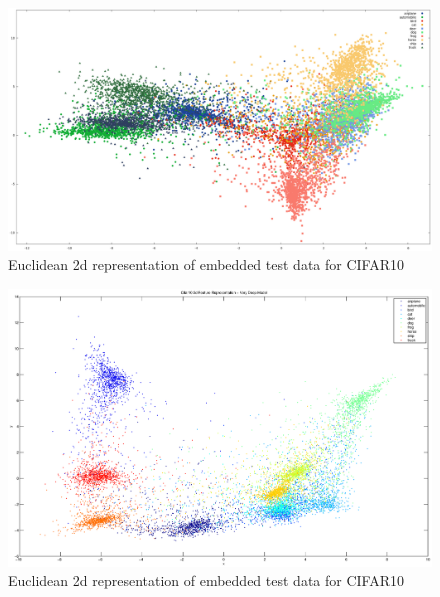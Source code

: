 \documentclass{article} %
\begin{document}
\begin{figure}[h]
\begin{center}
\includegraphics[width=1\linewidth]{EuclideanRepresentation.eps}
\end{center}
   \caption{Euclidean 2d representation of embedded test data for CIFAR10}\label{EuclideanRepresentation}
\end{figure}
\begin{figure}[h]
\begin{center}
\includegraphics[width=1\linewidth]{Rep.eps}
\end{center}
   \caption{Euclidean 2d representation of embedded test data for CIFAR10}\label{TripletRepCIFAR10}
\end{figure}
\end{document}
